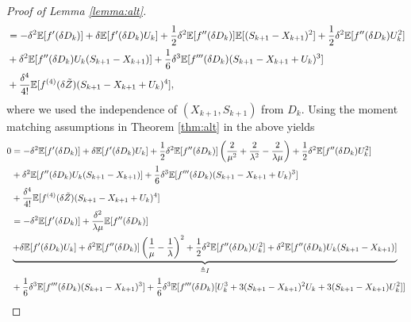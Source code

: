 \documentclass[11pt,letterpaper,reqno]{article}
\theoremstyle{thmstyleone}%
\theoremstyle{thmstyletwo}%
\theoremstyle{thmstylethree}%
\numberwithin{equation}{section}
\begin{document}
\begin{proof}[Proof of Lemma \ref{lemma:alt}]
\begin{align}
\nonumber    &= -\delta^2 \mathbb E[f'(\delta D_k)] +\delta \mathbb E[f'(\delta D_k)U_k]+\frac{1}{2}\delta^2 \mathbb E[f''(\delta D_k)] \mathbb E[(S_{k+1}-X_{k+1})^2]+\frac{1}{2}\delta^2 \mathbb E[f''(\delta D_k)U_k^2]\\
\nonumber    &+\delta^2 \mathbb E[f''(\delta D_k)U_k(S_{k+1}-X_{k+1})]+\frac{1}{6}\delta^3\mathbb E[f'''(\delta D_k)(S_{k+1}-X_{k+1}+U_k)^3]\\
&+\frac{\delta^4}{4!}\mathbb E[f^{(4)}(\delta \Tilde{Z})(S_{k+1}-X_{k+1}+U_k)^4],
\end{align}
where we used the independence of $(X_{k+1},S_{k+1})$ from $D_k$. 
Using the moment matching assumptions in Theorem \ref{thm:alt} in the above yields
\begin{align}\label{lindeq5}
    0&=-\delta^2 \mathbb E[f'(\delta D_k)] +\delta \mathbb E[f'(\delta D_k)U_k]+\frac{1}{2}\delta^2 \mathbb E[f''(\delta D_k)]\left(\frac{2}{\mu^2}+\frac{2}{\lambda^2}-\frac{2}{\lambda \mu} \right)+\frac{1}{2}\delta^2 \mathbb E[f''(\delta D_k)U_k^2] \nonumber\\
\nonumber    &+\delta^2 \mathbb E[f''(\delta D_k)U_k(S_{k+1}-X_{k+1})]+\frac{1}{6}\delta^3\mathbb E[f'''(\delta D_k)(S_{k+1}-X_{k+1}+U_k)^3]\\
&+\frac{\delta^4}{4!}\mathbb E[f^{(4)}(\delta \Tilde{Z})(S_{k+1}-X_{k+1}+U_k)^4] \nonumber\\
&=-\delta^2 \mathbb E[f'(\delta D_k)]+\frac{\delta^2}{\lambda \mu} \mathbb E[f''(\delta D_k)] \nonumber\\
&\underbrace{+\delta \mathbb E[f'(\delta D_k)U_k]+\delta^2 \mathbb E[f''(\delta D_k)]\left(\frac{1}{\mu}-\frac{1}{\lambda}\right)^2+\frac{1}{2}\delta^2 \mathbb E[f''(\delta D_k)U_k^2]+\delta^2 \mathbb E[f''(\delta D_k)U_k(S_{k+1}-X_{k+1})]}_{\triangleq I} \nonumber\\
&+\frac{1}{6}\delta^3\mathbb E[f'''(\delta D_k)(S_{k+1}-X_{k+1})^3]+\frac{1}{6}\delta^3 \mathbb E[f'''(\delta D_k) [U_k^3+3(S_{k+1}-X_{k+1})^2U_k+3(S_{k+1}-X_{k+1})U_k^2]] \nonumber\\

\end{align}
\end{proof}
\end{document}
